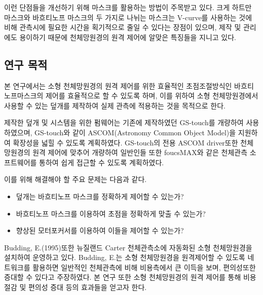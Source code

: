 이런 단점들을 개선하기 위해 마스크를 활용하는 방법이 주목받고 있다. 크게 하트만 마스크와 바흐티노프 마스크의 두 가지로 나뉘는 마스크는 V-curve를 사용하는 것에 비해 관측시에 필요한 시간을 획기적으로 줄일 수 있다는 장점이 있으며, 제작 및 관리에도 용이하기 때문에 천체망원경의 원격 제어에 알맞은 특징들을 지니고 있다.





\subsection{연구 목적}

본 연구에서는 소형 천체망원경의 원격 제어를 위한 효율적인 초점조절방식인 바흐티노프마스크의 제어를 효율적으로 할 수 있도록 하며, 이를 위하여 소형 천체망원경에서 사용할 수 있는 덮개를 제작하여 실제 관측에 적용하는 것을 목적으로 한다. 


제작한 덮개 및 시스템을 위한 펌웨어는 기존에 제작하였던 GS-touch를 개량하여 사용하였으며, GS-touch와 같이 ASCOM(Astronomy Common Object Model)을 지원하여 확장성을 넓힐 수 있도록 계획하였다. GS-touch의 전용 ASCOM driver또한 천체망원경의 원격 제어에 맞추어 개량하여 일반인들 또한 foucsMAX와 같은 천체관측 소프트웨어를 통하여 쉽게 접근할 수 있도록 계획하였다.


이를 위해 해결해야 할 주요 문제는 다음과 같다.

\begin{itemize}
	
	\item{덮개는 바흐티노프 마스크를 정확하게 제어할 수 있는가?}\\[-34pt]
	\item{바흐티노프 마스크를 이용하여 초점을 정확하게 맞출 수 있는가?}\\[-34pt]
	\item{향상된 모터포커서를 이용하여 이들을 제어할 수 있는가?}
	
\end{itemize}


Budding, E.(1995)또한 뉴질랜드 Carter 천체관측소에 자동화된 소형 천체망원경을 설치하여 운영하고 있다. Budding, E.는 소형 천체망원경을 원격제어할 수 있도록 네트워크를 활용하면 일반적인 천체관측에 비해 비용측에서 큰 이득을 보며, 편의성또한 증대할 수 있다고 주장하였다.\cite{Budding1995auto} 본 연구 또한 소형 천체망원경의 원격 제어를 통해 비용절감 및 편의성 증대 등의 효과들을 얻고자 한다.

\begin{comment}
제작한 모터 포커서 컨트롤러는 GS-touch로 명명하였다. GS-touch는 스테핑 모터를 구동할 수 있고 컴퓨터로 제어할 수 있도록 설계하였으며, 전용 ASCOM (Astronomy Common Object Model) dirver를 개발하여 ASCOM을 지원하는 천문 소프트웨어를 이용하여 쉽게 사용할 수 있도록 하였다.
\end{comment}



